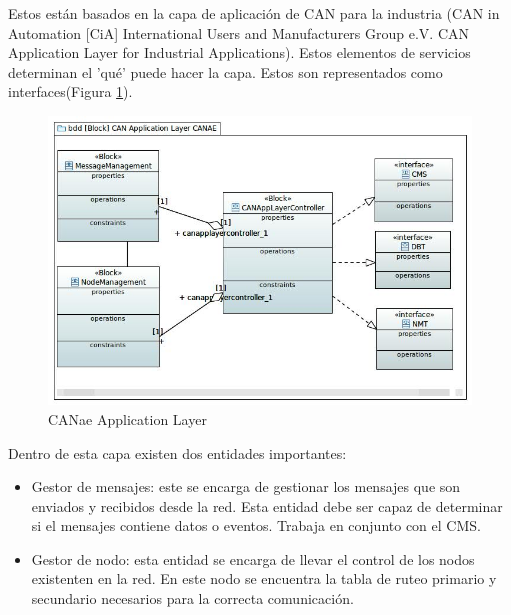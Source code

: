 Estos están basados en la capa de aplicación de CAN para la industria (CAN in Automation [CiA] International Users and Manufacturers Group e.V. CAN Application Layer for Industrial Applications). Estos elementos de servicios determinan el 'qué' puede hacer la capa. Estos son representados como interfaces(Figura \ref{fig:CANAE_APP_LAYER}).

\begin{figure}[h!]
 \centering
 \includegraphics[scale=0.5]{images/Secciones/AppendixA/CAN_Application_Layer_CANAE.jpg}
  \caption{CANae Application Layer}
\label{fig:CANAE_APP_LAYER}
\end{figure}

Dentro de esta capa existen dos entidades importantes:
\begin{itemize}
\item Gestor de mensajes: este se encarga de gestionar los mensajes que son enviados y recibidos desde la red. Esta entidad debe ser capaz de determinar si el mensajes contiene datos o eventos. Trabaja en conjunto con el CMS.
  
\item Gestor de nodo: esta entidad se encarga de llevar el control de los nodos existenten en la red. En este nodo se encuentra la tabla de ruteo primario y secundario necesarios para la correcta comunicación.
  
\end{itemize}


